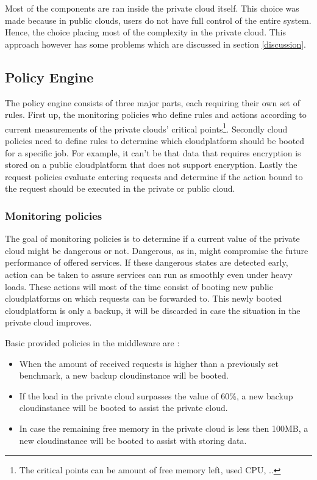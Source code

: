 \documentclass[journal]{IEEEtran}
\begin{document}
Most of the components are ran inside the private cloud itself.
This choice was made because in public clouds, users do not have full control of the entire system.
Hence, the choice placing most of the complexity in the private cloud.
This approach however has some problems which are discussed in section \ref{discussion}.

\subsection{Policy Engine}
The policy engine consists of three major parts, each requiring their own set of rules.
First up, the monitoring policies who define rules and actions according to current measurements of the private clouds' critical points\footnote{The critical points can be amount of free memory left, used CPU, ..}.
Secondly cloud policies need to define rules to determine which cloudplatform should be booted for a specific job.
For example, it can't be that data that requires encryption is stored on a public cloudplatform that does not support encryption.
Lastly the request policies evaluate entering requests and determine if the action bound to the request should be executed in the private or public cloud.\newline

\subsubsection{Monitoring policies}
The goal of monitoring policies is to determine if a current value of the private cloud might be dangerous or not.
Dangerous, as in, might compromise the future performance of offered services.
If these dangerous states are detected early, action can be taken to assure services can run as smoothly even under heavy loads.
These actions will most of the time consist of booting new public cloudplatforms on which requests can be forwarded to.
This newly booted cloudplatform is only a backup, it will be discarded in case the situation in the private cloud improves.\newline

Basic provided policies in the middleware are :
\begin{itemize}
    \item When the amount of received requests is higher than a previously set benchmark, a new backup cloudinstance will be booted.
    \item If the load in the private cloud surpasses the value of 60\%, a new backup cloudinstance will be booted to assist the private cloud.
    \item In case the remaining free memory in the private cloud is less then 100MB, a new cloudinstance will be booted to assist with storing data.
\end{itemize}
\end{document}
